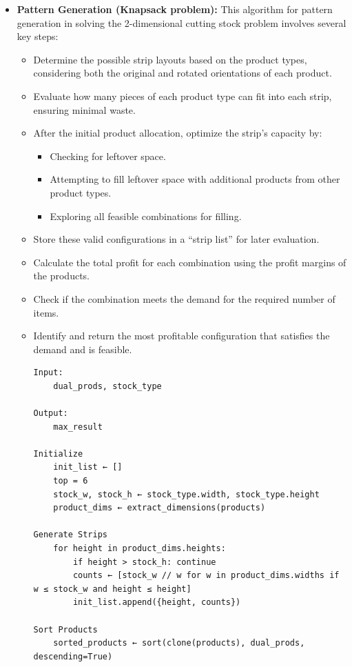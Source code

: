 \documentclass[a4paper]{article}
\begin{document}
\begin{itemize}
\item \textbf{Pattern Generation (Knapsack problem): }
This algorithm for pattern generation in solving the 2-dimensional cutting stock problem involves several key steps:
\begin{itemize}
    \item Determine the possible strip layouts based on the product types, considering both the original and rotated orientations of each product.
    \item Evaluate how many pieces of each product type can fit into each strip, ensuring minimal waste.
    \item After the initial product allocation, optimize the strip’s capacity by:
    \begin{itemize}
        \item Checking for leftover space.
        \item Attempting to fill leftover space with additional products from other product types.
        \item Exploring all feasible combinations for filling.
    \end{itemize}
    \item Store these valid configurations in a ``strip list'' for later evaluation.
    \item Calculate the total profit for each combination using the profit margins of the products.
    \item Check if the combination meets the demand for the required number of items.
    \item Identify and return the most profitable configuration that satisfies the demand and is feasible.
    
\begin{verbatim}
Input:
    dual_prods, stock_type

Output:
    max_result

Initialize
    init_list ← []
    top = 6
    stock_w, stock_h ← stock_type.width, stock_type.height
    product_dims ← extract_dimensions(products)

Generate Strips
    for height in product_dims.heights:
        if height > stock_h: continue
        counts ← [stock_w // w for w in product_dims.widths if w ≤ stock_w and height ≤ height]
        init_list.append({height, counts})

Sort Products
    sorted_products ← sort(clone(products), dual_prods, descending=True)


\end{verbatim}
\end{itemize}
\end{itemize}
\end{document}
